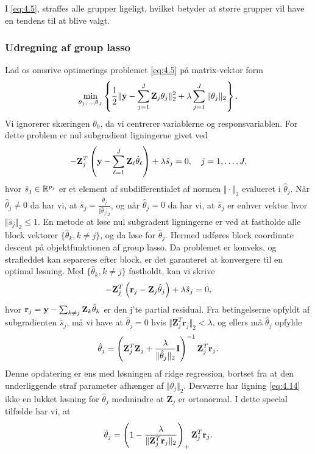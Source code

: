 I \eqref{eq:4.5}, straffes alle grupper ligeligt, hvilket betyder at større grupper vil have en tendens til at blive valgt.


\subsubsection{Udregning af group lasso}
Lad os omsrive optimerings problemet \eqref{eq:4.5} på matrix-vektor form
\begin{align*}
\min_{\theta_1, \ldots, \theta_J} \cbr{\frac{1}{2} \Vert \y - \sum_{j=1}^J \mathbf{Z}_{j} \theta_j \Vert_2^2 + \lambda \sum_{j=1}^J \Vert \theta_j \Vert_2}.
\end{align*}
Vi ignorerer skæringen $\theta_0$, da vi centrerer variablerne og responsvariablen.
For dette problem er nul subgradient ligningerne givet ved
\begin{align*}
- \mathbf{Z}_{j}^T \del{\y - \sum_{\ell=1}^J \mathbf{Z}_\ell \hat{\theta}_\ell} + \lambda \hat{s}_j = 0, \quad j=1,\ldots, J,
\end{align*} 
hvor $\hat{s}_j \in \mathbb{R}^{p_j}$ er et element af subdifferentialet af normen $\Vert \cdot \Vert_2$ evalueret i $\hat{\theta}_j$.
Når $\hat{\theta}_j \neq 0$ da har vi, at $\hat{s}_j = \frac{\hat{\theta}_j}{\Vert \hat{\theta}_j \vert_2}$, og når $\hat{\theta}_j=0$ da har vi, at $\hat{s}_j$ er enhver vektor hvor $\Vert \hat{s}_j \Vert_2 \leq 1$.
En metode at løse nul subgradent ligningerne er ved at fastholde alle block vektorer $\{\hat{\theta}_k, k \neq j\}$, og da løse for $\hat{\theta}_j$.
Hermed udføres block coordinate descent på objektfunktionen af group lasso.
Da problemet er konveks, og strafleddet kan separeres efter block, er det garanteret at konvergere til en optimal løsning.
Med $\{\hat{\theta}_k, k \neq j\}$ fastholdt, kan vi skrive
\begin{align*}
- \mathbf{Z}_{j}^T \del{\mathbf{r}_j - \mathbf{Z}_j \hat{\theta}_j} + \lambda \hat{s}_j = 0,
\end{align*}
hvor $\mathbf{r}_j = \mathbf{y} - \sum_{k \neq j} \mathbf{Z}_k \hat{\theta}_k $ er den j'te partial residual.
Fra betingelserne opfyldt af subgradienten $\hat{s}_j$, må vi have at $\hat{\theta}_j =0$ hvis $\Vert \mathbf{Z}_j^T \mathbf{r}_j \Vert_2 < \lambda$, og ellers må $\hat{\theta}_j$ opfylde
\begin{align}
\hat{\theta}_j = \del{\mathbf{Z}_j^T \mathbf{Z}_j + \frac{\lambda}{\Vert \hat{\theta}_j \Vert_2} \mathbf{I}}^{-1} \mathbf{Z}_j^T \mathbf{r}_j. \label{eq:4.14}
\end{align}
Denne opdatering er ens med løsningen af ridge regression, bortset fra at den underliggende straf parameter afhænger af $\Vert \hat{\theta}_j \Vert_2$.
Desværre har ligning \eqref{eq:4.14} ikke en lukket løsning for $\hat{\theta}_j$ medmindre at $\mathbf{Z}_j$ er ortonormal. I dette special tilfælde har vi, at
\begin{align*}
\hat{\theta}_j = \del{1 - \frac{\lambda}{\Vert \mathbf{Z}_j^T \mathbf{r}_j \Vert_2}}_+  \mathbf{Z}_j^T \mathbf{r}_j.
\end{align*}

